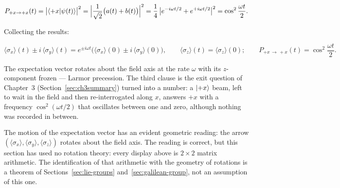 \begin{linenomath}
    \begin{equation*}
        P_{+x\to+x}(t) = \bigl|\braket{+x|\psi(t)}\bigr|^{2}
        = \Bigl|\frac{1}{\sqrt{2}}\bigl(a(t)+b(t)\bigr)\Bigr|^{2}
        = \frac{1}{4}\,\bigl|e^{-i\omega t/2}+e^{+i\omega t/2}\bigr|^{2}
        = \cos^{2}\frac{\omega t}{2} .
    \end{equation*}
\end{linenomath}
Collecting the results:
\begin{linenomath}
    \begin{equation}
        \langle\sigma_x\rangle(t) \pm i\,\langle\sigma_y\rangle(t) = e^{\pm i\omega t}\bigl(\langle\sigma_x\rangle(0) \pm i\,\langle\sigma_y\rangle(0)\bigr), \qquad \langle\sigma_z\rangle(t) = \langle\sigma_z\rangle(0); \qquad P_{+x\,\to\,+x}(t) = \cos^2\frac{\omega t}{2} .
        \label{eq:precession}
    \end{equation}
\end{linenomath}
The expectation vector rotates about the field axis at the rate $\omega$ with its $z$-component frozen --- Larmor precession. The third clause is the exit question of Chapter~3 (Section~\ref{sec:ch3summary}) turned into a number: a $\ket{+x}$ beam, left to wait in the field and then re-interrogated along $x$, answers $+x$ with a frequency $\cos^2(\omega t/2)$ that oscillates between one and zero, although nothing was recorded in between.

\begin{note}
The motion of the expectation vector has an evident geometric reading: the arrow $(\langle\sigma_x\rangle, \langle\sigma_y\rangle, \langle\sigma_z\rangle)$ rotates about the field axis. The reading is correct, but this section has used no rotation theory: every display above is $2\times 2$ matrix arithmetic. The identification of that arithmetic with the geometry of rotations is a theorem of Sections~\ref{sec:lie-groups} and~\ref{sec:galilean-group}, not an assumption of this one.
\end{note}

